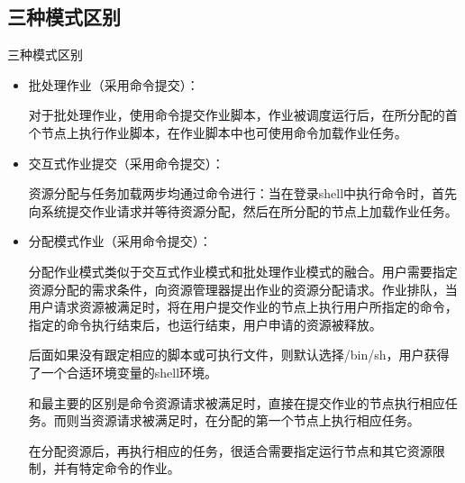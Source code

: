 
\subsection{三种模式区别}
\begin{frame}{三种模式区别}
\begin{itemize}
	\item 批处理作业（采用命令提交）：

对于批处理作业，使用命令提交作业脚本，作业被调度运行后，在所分配的首个节点上执行作业脚本，在作业脚本中也可使用命令加载作业任务。
	\item 交互式作业提交（采用命令提交）：

资源分配与任务加载两步均通过命令进行：当在登录shell中执行命令时，首先向系统提交作业请求并等待资源分配，然后在所分配的节点上加载作业任务。
	\item 分配模式作业（采用命令提交）：

分配作业模式类似于交互式作业模式和批处理作业模式的融合。用户需要指定资源分配的需求条件，向资源管理器提出作业的资源分配请求。作业排队，当用户请求资源被满足时，将在用户提交作业的节点上执行用户所指定的命令，指定的命令执行结束后，也运行结束，用户申请的资源被释放。

后面如果没有跟定相应的脚本或可执行文件，则默认选择/bin/sh，用户获得了一个合适环境变量的shell环境。

和最主要的区别是命令资源请求被满足时，直接在提交作业的节点执行相应任务。而则当资源请求被满足时，在分配的第一个节点上执行相应任务。

在分配资源后，再执行相应的任务，很适合需要指定运行节点和其它资源限制，并有特定命令的作业。
\end{itemize}
\end{frame}

